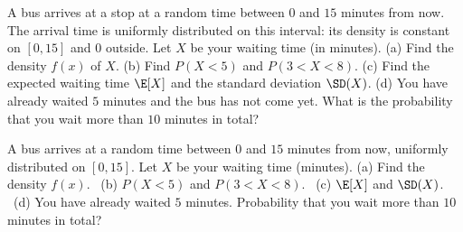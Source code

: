 
\begin{problem}
	A bus arrives at a stop at a random time between $0$ and $15$ minutes from
	now. The arrival time is uniformly distributed on this interval: its
	density is constant on $[0,15]$ and $0$ outside. Let $X$ be your
	waiting time (in minutes).
	(a) Find the density $f(x)$ of $X$.
	(b) Find $P(X<5)$ and $P(3<X<8)$.
	(c) Find the expected waiting time $\E[X]$ and the standard deviation
	$\SD(X)$.
	(d) You have already waited $5$ minutes and the bus has not come yet. What
	is the probability that you wait more than $10$ minutes in total?
\end{problem}

\begin{slideproblem}
	A bus arrives at a random time between $0$ and $15$ minutes from now,
	uniformly distributed on $[0,15]$. Let $X$ be your waiting time
	(minutes).
	(a) Find the density $f(x)$.
	\ (b) $P(X<5)$ and $P(3<X<8)$.
	\ (c) $\E[X]$ and $\SD(X)$.
	\ (d) You have already waited $5$ minutes. Probability that you wait more
	than $10$ minutes in total?
\end{slideproblem}

